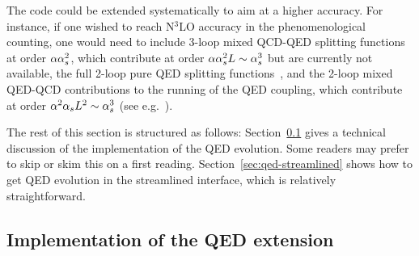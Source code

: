 %
The code could be extended systematically to aim at a higher
accuracy. For instance, if one wished to reach N$^3$LO accuracy in the
phenomenological counting, one would need to include 3-loop mixed
QCD-QED splitting functions at order $\alpha \alpha_s^2$, which contribute
at order $\alpha \alpha_s^2 L \sim \alpha_s^3$ but are currently not
available, the full 2-loop pure QED splitting functions~\cite{deFlorian:2016gvk}, 
%
and the 2-loop mixed QED-QCD contributions to the running
of the QED coupling, which contribute at order $\alpha^2 \alpha_s L^2 \sim \alpha_s^3$
(see e.g.\ \cite{Cieri:2018sfk}). 
% 
%

The rest of this section is structured as follows:
Section~\ref{sec:qed-implementation} gives a technical discussion of
the implementation of the QED evolution.
%
Some readers may prefer to skip or skim this on a first reading.
%
Section~\ref{sec:qed-streamlined} shows how to get QED evolution in
the streamlined interface, which is relatively straightforward.

\subsection{Implementation of the QED extension}
\label{sec:qed-implementation}


